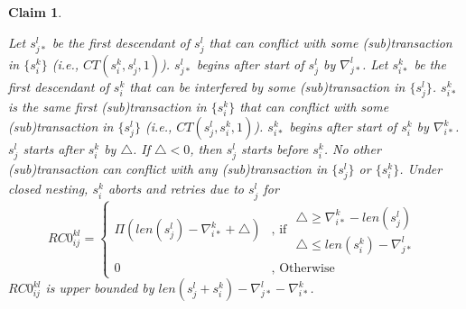 \documentclass[10pt, conference, compsocconf]{IEEEtran}
\newtheorem{clm}{Claim}
\begin{document}
\begin{clm}\label{clm:parent_child_retry_cost}

Let $s_{j*}^{l}$ be the first descendant of $s_{j}^{l}$ that can
conflict with some (sub)transaction in $\{s_{i}^{k}\}$ (i.e., $CT(s_{i}^{k},s_{j}^{l},1)$).
$s_{j*}^{l}$ begins after start of $s_{j}^{l}$ by $\nabla_{j*}^{l}$.
Let $s_{i*}^{k}$ be the first descendant of $s_{i}^{k}$ that can
be interfered by some (sub)transaction in $\{s_{j}^{l}\}$. $s_{i*}^{k}$
is the same first (sub)transaction in $\{s_{i}^{k}\}$ that can conflict
with some (sub)transaction in $\{s_{j}^{l}\}$ (i.e., $CT(s_{j}^{l},s_{i}^{k},1)$).
$s_{i*}^{k}$ begins after start of $s_{i}^{k}$ by $\nabla_{i*}^{k}$.
$s_{j}^{l}$ starts after $s_{i}^{k}$ by $\triangle$. If $\triangle<0$,
then $s_{j}^{l}$ starts before $s_{i}^{k}$. No other (sub)transaction
can conflict with any (sub)transaction in $\{s_{j}^{l}\}$ or $\{s_{i}^{k}\}$.
Under closed nesting, $s_{i}^{k}$ aborts and retries due to $s_{j}^{l}$
for 
\begin{equation}
RC0_{ij}^{kl}=\begin{cases}
\Pi\left(len\left(s_{j}^{l}\right)-\nabla_{i*}^{k}+\triangle\right) & \mbox{, if }\begin{gathered}\triangle\ge\nabla_{i*}^{k}-len\left(s_{j}^{l}\right)\\
\triangle\le len\left(s_{i}^{k}\right)-\nabla_{j*}^{l}
\end{gathered}
\\
0 & \mbox{, Otherwise}
\end{cases}\label{eq:parent_child_retry_cost}
\end{equation}
%
$RC0_{ij}^{kl}$ is upper bounded by $len\left(s_{j}^{l}+s_{i}^{k}\right)-\nabla_{j*}^{l}-\nabla_{i*}^{k}$.

\end{clm}
\end{document}
